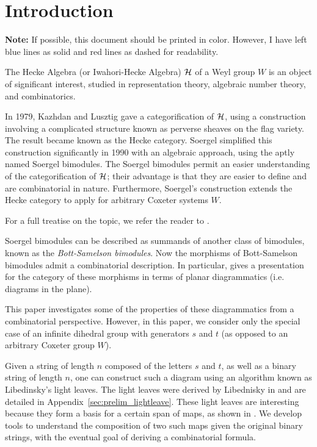 \section{Introduction}
\textbf{Note:} If possible, this document should be printed in color.  However, I have left blue lines as solid and red lines as dashed for readability.

The Hecke Algebra (or Iwahori-Hecke Algebra) $\mathcal H$ of a Weyl group $W$ is an object of significant interest, studied in representation theory, algebraic number theory, and combinatorics.

In 1979, Kazhdan and Lusztig \cite{ref:KaLu1,ref:KaLu2} gave a categorification of $\mathcal H$, using a construction involving a complicated structure known as perverse sheaves on the flag variety.  The result became known as the Hecke category.
Soergel \cite{ref:Soe1,ref:Soe2} simplified this construction significantly in 1990 with an algebraic approach, using the aptly named Soergel bimodules.  The Soergel bimodules permit an easier understanding of the categorification of $\mathcal H$; their advantage is that they are easier to define and are combinatorial in nature.
Furthermore, Soergel's construction extends the Hecke category to apply for arbitrary Coxeter systems $W$.

For a full treatise on the topic, we refer the reader to \cite{ref:Humphreys}.

Soergel bimodules can be described as summands of another class of bimodules, known as the \emph{Bott-Samelson bimodules}.
Now the morphisms of Bott-Samelson bimodules admit a combinatorial description.  In particular, \cite{ref:gr4all} gives a presentation for the category of these morphisms in terms of planar diagrammatics (i.e. diagrams in the plane).

This paper investigates some of the properties of these diagrammatics from a combinatorial perspective.   However, in this paper, we consider only the special case of an infinite dihedral group with generators $s$ and $t$ (as opposed to an arbitrary Coxeter group $W$).

Given a string of length $n$ composed of the letters $s$ and $t$, as well as a binary string of length $n$, one can construct such a diagram using an algorithm known as Libedinsky's light leaves.  The light leaves were derived by Libednisky in \cite{ref:Lib} and are detailed in Appendix~\ref{sec:prelim_lightleave}.  
These light leaves are interesting because they form a basis for a certain span of maps, as shown in \cite{ref:gr4all}.
We develop tools to understand the composition of two such maps given the original binary strings, with the eventual goal of deriving a combinatorial formula.

